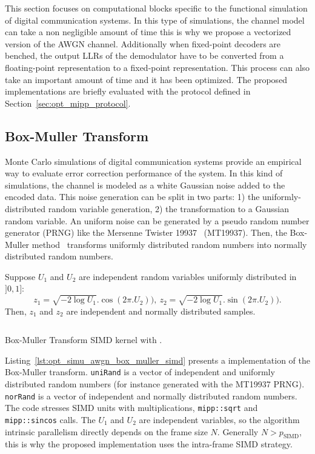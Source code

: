 This section focuses on computational blocks specific to the functional
simulation of digital communication systems. In this type of simulations,
the channel model can take a non negligible amount of time this is why we
propose a vectorized version of the AWGN channel. Additionally when fixed-point
decoders are benched, the output LLRs of the demodulator have to be converted
from a floating-point representation to a fixed-point representation. This
process can also take an important amount of time and it has been optimized.
The proposed implementations are briefly evaluated with the protocol defined in
Section~\ref{sec:opt_mipp_protocol}.

\subsection{Box-Muller Transform}
\label{sec:opt_simu_awgn}

Monte Carlo simulations of digital communication systems provide an empirical
way to evaluate error correction performance of the system. In this kind of
simulations, the channel is modeled as a white Gaussian noise added to the
encoded data. This noise generation can be split in two parts: 1) the
uniformly-distributed random variable generation, 2) the transformation to a
Gaussian random variable. An uniform noise can be generated by a pseudo random
number generator (PRNG) like the Mersenne Twister 19937~\cite{Matsumoto1998}
(MT19937). Then, the Box-Muller method~\cite{Box1958} transforms uniformly
distributed random numbers into normally distributed random numbers.

Suppose $U_1$ and $U_2$ are independent random variables uniformly distributed
in $]0, 1]$:
\begin{equation*}
  z_1 = \sqrt{-2 \log{U_1}}.\cos(2\pi.U_2)),~z_2 = \sqrt{-2 \log{U_1}}.\sin(2\pi.U_2)).
\end{equation*}
Then, $z_1$ and $z_2$ are independent and normally distributed samples.

\begin{listing}[htp]
  \inputminted[frame=lines,linenos]{C++}{main/chapter3/src/simu/awgn/box_muller_simd.cpp}
  \caption{Box-Muller Transform SIMD kernel with \MIPP.}
  \label{lst:opt_simu_awgn_box_muller_simd}
\end{listing}

Listing~\ref{lst:opt_simu_awgn_box_muller_simd} presents a \MIPP implementation
of the Box-Muller transform. \verb|uniRand| is a vector of independent and
uniformly distributed random numbers (for instance generated with the MT19937
PRNG). \verb|norRand| is a vector of independent and normally distributed random
numbers. The code stresses SIMD units with multiplications, \verb|mipp::sqrt|
and \verb|mipp::sincos| calls. The $U_1$ and $U_2$ are independent variables, so
the algorithm intrinsic parallelism directly depends on the frame size $N$.
Generally $N > p_\text{SIMD}$, this is why the proposed implementation uses the
intra-frame SIMD strategy.


